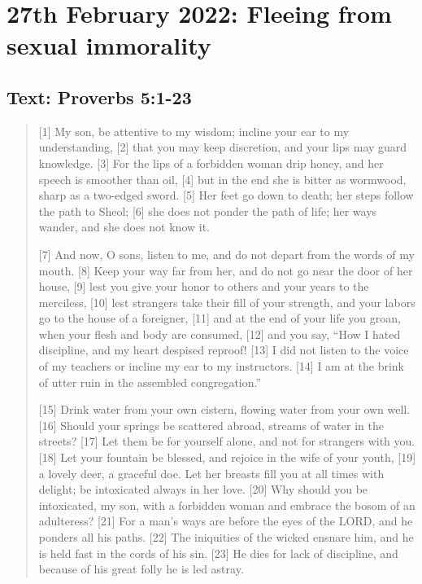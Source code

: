 \section{27th February 2022: Fleeing from sexual immorality}
\subsection*{Text: Proverbs 5:1-23}
  \begin{quote}
    [1] My son, be attentive to my wisdom;
        incline your ear to my understanding,
    [2] that you may keep discretion,
        and your lips may guard knowledge.
    [3] For the lips of a forbidden woman drip honey,
        and her speech is smoother than oil,
    [4] but in the end she is bitter as wormwood,
        sharp as a two-edged sword.
    [5] Her feet go down to death;
        her steps follow the path to Sheol;
    [6] she does not ponder the path of life;
        her ways wander, and she does not know it.


    [7] And now, O sons, listen to me,
        and do not depart from the words of my mouth.
    [8] Keep your way far from her,
        and do not go near the door of her house,
    [9] lest you give your honor to others
        and your years to the merciless,
    [10] lest strangers take their fill of your strength,
        and your labors go to the house of a foreigner,
    [11] and at the end of your life you groan,
        when your flesh and body are consumed,
    [12] and you say, “How I hated discipline,
        and my heart despised reproof!
    [13] I did not listen to the voice of my teachers
        or incline my ear to my instructors.
    [14] I am at the brink of utter ruin
        in the assembled congregation.”


    [15] Drink water from your own cistern,
        flowing water from your own well.
    [16] Should your springs be scattered abroad,
        streams of water in the streets?
    [17] Let them be for yourself alone,
        and not for strangers with you.
    [18] Let your fountain be blessed,
        and rejoice in the wife of your youth,
    [19]     a lovely deer, a graceful doe.
    Let her breasts fill you at all times with delight;
        be intoxicated always in her love.
    [20] Why should you be intoxicated, my son, with a forbidden woman
        and embrace the bosom of an adulteress?
    [21] For a man’s ways are before the eyes of the LORD,
        and he ponders all his paths.
    [22] The iniquities of the wicked ensnare him,
        and he is held fast in the cords of his sin.
    [23] He dies for lack of discipline,
        and because of his great folly he is led astray.
  \end{quote}
